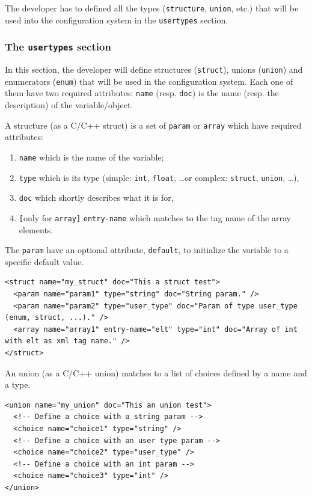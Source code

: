 \documentclass{article}
\begin{document}
\noindent The developer has to defined all the types (\texttt{structure}, \texttt{union}, etc.) that will be used into the configuration system in the \texttt{usertypes} section.

\subsubsection{The \texttt{usertypes} section}

In this section, the developer will define structures (\texttt{struct}), unions (\texttt{union}) and enumerators (\texttt{enum}) that will be used in the configuration system. Each one of them have two required attributes:
\texttt{name} (resp. \texttt{doc}) is the name (resp. the description) of the variable/object.
\newline

\noindent A structure (as a C/C++ struct) is a set of \texttt{param} or \texttt{array} which have required attributes:
\begin{enumerate}
\item \texttt{name} which is the name of the variable;
\item \texttt{type} which is its type (simple: \texttt{int}, \texttt{float}, \dots or complex: \texttt{struct}, \texttt{union}, \dots),
\item \texttt{doc} which shortly describes what it is for,
\item \verb![!only for \texttt{array}\verb!]! \texttt{entry-name} which matches to the tag name of the array elements.
\end{enumerate}

\noindent The \texttt{param} have an optional attribute, \texttt{default}, to initialize the variable to a specific default value.

\lstset{language=XML}
\begin{lstlisting}[title=Example of a \texttt{struct} definition]
<struct name="my_struct" doc="This a struct test">
  <param name="param1" type="string" doc="String param." />
  <param name="param2" type="user_type" doc="Param of type user_type (enum, struct, ...)." />
  <array name="array1" entry-name="elt" type="int" doc="Array of int with elt as xml tag name." />
</struct>
\end{lstlisting}

\noindent An union (as a C/C++ union) matches to a list of choices defined by a name and a type.

\lstset{language=XML}
\begin{lstlisting}[title=Example of a \texttt{union} definition]
<union name="my_union" doc="This an union test">
  <!-- Define a choice with a string param -->
  <choice name="choice1" type="string" />
  <!-- Define a choice with an user type param -->
  <choice name="choice2" type="user_type" />
  <!-- Define a choice with an int param -->
  <choice name="choice3" type="int" />
</union>
\end{lstlisting}
\end{document}
